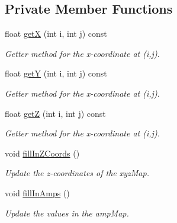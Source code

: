 \subsection*{Private Member Functions}
\begin{DoxyCompactItemize}
\item 
float \hyperlink{class_p_m_d_camera_a6d5662f8c84cb9c12ad71a70159a6f3a}{getX} (int i, int j) const
\begin{DoxyCompactList}\small\item\em Getter method for the x-\/coordinate at (i,j). \end{DoxyCompactList}\item 
float \hyperlink{class_p_m_d_camera_a71344967a964b6c45fc7dfd8b5f56e63}{getY} (int i, int j) const
\begin{DoxyCompactList}\small\item\em Getter method for the x-\/coordinate at (i,j). \end{DoxyCompactList}\item 
float \hyperlink{class_p_m_d_camera_a98254399959993d8a181f17402845457}{getZ} (int i, int j) const
\begin{DoxyCompactList}\small\item\em Getter method for the x-\/coordinate at (i,j). \end{DoxyCompactList}\item 
\hypertarget{class_p_m_d_camera_a9d67405b9e1e4d4631b218adaa0326ed}{}\label{class_p_m_d_camera_a9d67405b9e1e4d4631b218adaa0326ed} 
void \hyperlink{class_p_m_d_camera_a9d67405b9e1e4d4631b218adaa0326ed}{fill\+In\+Z\+Coords} ()
\begin{DoxyCompactList}\small\item\em Update the z-\/coordinates of the xyz\+Map. \end{DoxyCompactList}\item 
\hypertarget{class_p_m_d_camera_aba055c818c275cf76d73527395937943}{}\label{class_p_m_d_camera_aba055c818c275cf76d73527395937943} 
void \hyperlink{class_p_m_d_camera_aba055c818c275cf76d73527395937943}{fill\+In\+Amps} ()
\begin{DoxyCompactList}\small\item\em Update the values in the amp\+Map. \end{DoxyCompactList}\end{DoxyCompactItemize}
